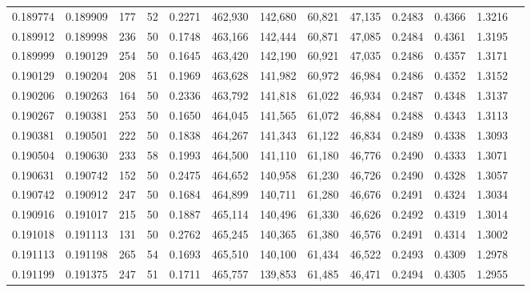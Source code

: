\begin{tabular}{rrrrrrrrrrrrr}
0.189774 & 0.189909 &   177 &  52 &                                     0.2271 & 462,930 & 142,680 &  60,821 &  47,135 & 0.2483 & 0.4366 & 1.3216 \\
0.189912 & 0.189998 &   236 &  50 &                                     0.1748 & 463,166 & 142,444 &  60,871 &  47,085 & 0.2484 & 0.4361 & 1.3195 \\
0.189999 & 0.190129 &   254 &  50 &                                     0.1645 & 463,420 & 142,190 &  60,921 &  47,035 & 0.2486 & 0.4357 & 1.3171 \\
0.190129 & 0.190204 &   208 &  51 &                                     0.1969 & 463,628 & 141,982 &  60,972 &  46,984 & 0.2486 & 0.4352 & 1.3152 \\
0.190206 & 0.190263 &   164 &  50 &                                     0.2336 & 463,792 & 141,818 &  61,022 &  46,934 & 0.2487 & 0.4348 & 1.3137 \\
0.190267 & 0.190381 &   253 &  50 &                                     0.1650 & 464,045 & 141,565 &  61,072 &  46,884 & 0.2488 & 0.4343 & 1.3113 \\
0.190381 & 0.190501 &   222 &  50 &                                     0.1838 & 464,267 & 141,343 &  61,122 &  46,834 & 0.2489 & 0.4338 & 1.3093 \\
0.190504 & 0.190630 &   233 &  58 &                                     0.1993 & 464,500 & 141,110 &  61,180 &  46,776 & 0.2490 & 0.4333 & 1.3071 \\
0.190631 & 0.190742 &   152 &  50 &                                     0.2475 & 464,652 & 140,958 &  61,230 &  46,726 & 0.2490 & 0.4328 & 1.3057 \\
0.190742 & 0.190912 &   247 &  50 &                                     0.1684 & 464,899 & 140,711 &  61,280 &  46,676 & 0.2491 & 0.4324 & 1.3034 \\
0.190916 & 0.191017 &   215 &  50 &                                     0.1887 & 465,114 & 140,496 &  61,330 &  46,626 & 0.2492 & 0.4319 & 1.3014 \\
0.191018 & 0.191113 &   131 &  50 &                                     0.2762 & 465,245 & 140,365 &  61,380 &  46,576 & 0.2491 & 0.4314 & 1.3002 \\
0.191113 & 0.191198 &   265 &  54 &                                     0.1693 & 465,510 & 140,100 &  61,434 &  46,522 & 0.2493 & 0.4309 & 1.2978 \\
0.191199 & 0.191375 &   247 &  51 &                                     0.1711 & 465,757 & 139,853 &  61,485 &  46,471 & 0.2494 & 0.4305 & 1.2955 \\

\end{tabular}
